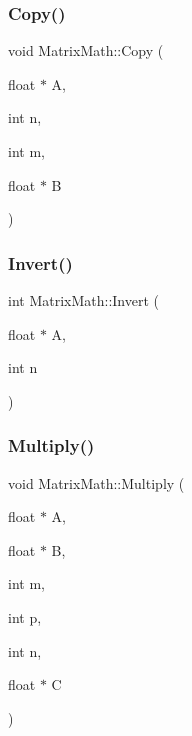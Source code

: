 \mbox{\label{class_matrix_math_a930d0115b62a5b90cea07fafea3143d4}} 
\subsubsection{\texorpdfstring{Copy()}{Copy()}}
{\footnotesize\ttfamily void Matrix\+Math\+::\+Copy (\begin{DoxyParamCaption}\item[{float $\ast$}]{A,  }\item[{int}]{n,  }\item[{int}]{m,  }\item[{float $\ast$}]{B }\end{DoxyParamCaption})}

\mbox{\label{class_matrix_math_ab9bf40bb3ecbab43d151030616ef70c0}} 
\subsubsection{\texorpdfstring{Invert()}{Invert()}}
{\footnotesize\ttfamily int Matrix\+Math\+::\+Invert (\begin{DoxyParamCaption}\item[{float $\ast$}]{A,  }\item[{int}]{n }\end{DoxyParamCaption})}

\mbox{\label{class_matrix_math_a70c07a8ea30698f5e824b1e759a0fa50}} 
\subsubsection{\texorpdfstring{Multiply()}{Multiply()}}
{\footnotesize\ttfamily void Matrix\+Math\+::\+Multiply (\begin{DoxyParamCaption}\item[{float $\ast$}]{A,  }\item[{float $\ast$}]{B,  }\item[{int}]{m,  }\item[{int}]{p,  }\item[{int}]{n,  }\item[{float $\ast$}]{C }\end{DoxyParamCaption})}

